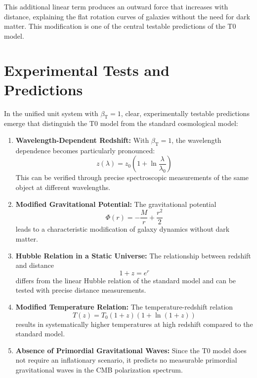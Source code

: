 \documentclass[12pt,a4paper]{article}
\newcommand{\betaT}{\beta_{\text{T}}}
\begin{document}
	This additional linear term produces an outward force that increases with distance, explaining the flat rotation curves of galaxies without the need for dark matter. This modification is one of the central testable predictions of the T0 model.
	
	\section{Experimental Tests and Predictions}
	In the unified unit system with \(\betaT = 1\), clear, experimentally testable predictions emerge that distinguish the T0 model from the standard cosmological model:
	
	\begin{enumerate}
		\item \textbf{Wavelength-Dependent Redshift:} With \(\betaT = 1\), the wavelength dependence becomes particularly pronounced:
		\begin{equation}
			z(\lambda) = z_0 \left(1 + \ln \frac{\lambda}{\lambda_0}\right)
		\end{equation}
		This can be verified through precise spectroscopic measurements of the same object at different wavelengths.
		
		\item \textbf{Modified Gravitational Potential:} The gravitational potential 
		\begin{equation}
			\Phi(r) = -\frac{M}{r} + \frac{r^2}{2}
		\end{equation}
		leads to a characteristic modification of galaxy dynamics without dark matter.
		
		\item \textbf{Hubble Relation in a Static Universe:} The relationship between redshift and distance
		\begin{equation}
			1 + z = e^{r}
		\end{equation}
		differs from the linear Hubble relation of the standard model and can be tested with precise distance measurements.
		
		\item \textbf{Modified Temperature Relation:} The temperature-redshift relation
		\begin{equation}
			T(z) = T_0 (1+z)(1 + \ln(1+z))
		\end{equation}
		results in systematically higher temperatures at high redshift compared to the standard model.
		
		\item \textbf{Absence of Primordial Gravitational Waves:} Since the T0 model does not require an inflationary scenario, it predicts no measurable primordial gravitational waves in the CMB polarization spectrum.
	\end{enumerate}
	
\end{document}
